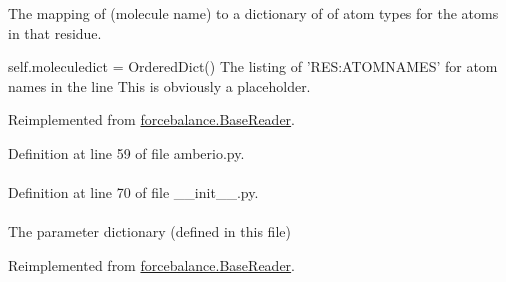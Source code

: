 \-The mapping of (molecule name) to a dictionary of of atom types for the atoms in that residue. 

self.\-moleculedict = \-Ordered\-Dict() \-The listing of '\-R\-E\-S\-:\-A\-T\-O\-M\-N\-A\-M\-E\-S' for atom names in the line \-This is obviously a placeholder. 

\-Reimplemented from \hyperlink{classforcebalance_1_1BaseReader_ab444c213e15929253dd73395ac5f19fc}{forcebalance.\-Base\-Reader}.



\-Definition at line 59 of file amberio.\-py.

\hypertarget{classforcebalance_1_1BaseReader_a4369b5fb663a83b11602daa71db6862e}{
\paragraph[{\-Molecules}]{}}\label{classforcebalance_1_1BaseReader_a4369b5fb663a83b11602daa71db6862e}


\-Definition at line 70 of file \-\_\-\-\_\-init\-\_\-\-\_\-.\-py.

\hypertarget{classforcebalance_1_1amberio_1_1Mol2__Reader_a638d61a7ff3ae5bd27d70a71f9b063ae}{
\paragraph[{pdict}]{}}\label{classforcebalance_1_1amberio_1_1Mol2__Reader_a638d61a7ff3ae5bd27d70a71f9b063ae}


\-The parameter dictionary (defined in this file) 



\-Reimplemented from \hyperlink{classforcebalance_1_1BaseReader_aaf18c900d6055ed4b5124f6bb26164c1}{forcebalance.\-Base\-Reader}.



